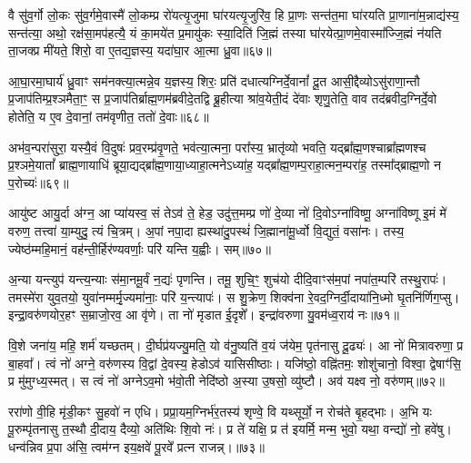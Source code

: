 वै सु॑व॒र्गो लो॒कः सु॑व॒र्गमे॒वास्मै॑ लो॒कम्प्र रो॑यत्यृ॒जुमा घा॑रयत्यृ॒जुरि॑व॒ हि प्रा॒णः सन्त॑त॒मा घा॑रयति प्रा॒णाना॑म॒न्नाद्य॑स्य॒ सन्त॑त्या॒ अथो॒ रक्ष॑सा॒मप॑हत्यै॒ यं का॒मये॑त प्र॒मायु॑कः स्या॒दिति॑ जि॒ह्मं तस्या घा॑रयेत्प्रा॒णमे॒वास्मा᳚ज्जि॒ह्मं न॑यति ता॒जक्प्र मी॑यते॒ शिरो॒ वा ए॒तद्य॒ज्ञस्य॒ यदा॑घा॒र आ॒त्मा ध्रु॒वा॥६७॥

आ॒घा॒रमा॒घार्य॑ ध्रु॒वाꣳ सम॑नक्त्या॒त्मन्ने॒व य॒ज्ञस्य॒ शिरः॒ प्रति॑ दधात्यग्निर्दे॒वानां᳚ दू॒त आसी॒द्दैव्यो\-ऽसु॑राणा॒न्तौ प्र॒जाप॑तिम्प्र॒श्ञमैता॒ꣳ॒ स प्र॒जाप॑तिर्ब्राह्म॒णम॑ब्रवीदे॒तद्वि ब्रू॒हीत्या श्रा॑व॒येती॒दं दे॑वाः शृणु॒तेति॒ वाव तद॑ब्रवीद॒ग्निर्दे॒वो होतेति॒ य ए॒व दे॒वानां॒ तम॑वृणीत॒ ततो॑ दे॒वाः॥६८॥

अभ॑व॒न्परा॑सुरा॒ यस्यै॒वं वि॒दुषः॑ प्रव॒रम्प्र॑वृ॒णते॒ भव॑त्या॒त्मना॒ परा᳚स्य॒ भ्रातृ॑व्यो भवति॒ यद्ब्रा᳚ह्म॒णश्चाब्रा᳚ह्मणश्च प्र॒श्ञमे॒यातां᳚ ब्राह्म॒णायाधि॑ ब्रूया॒द्यद्ब्रा᳚ह्म॒णाया॒ध्याहा॒त्मने\-ऽध्या॑ह॒ यद्ब्रा᳚ह्म॒णम्प॒राहा॒त्मन॒म्परा॑ह॒ तस्मा᳚द्ब्राह्म॒णो न प॒रोच्यः॑॥६९॥

{\anuvakamend[{वा आ॑र॒ण्याꣳश्चाव॑ रु॒न्धे\-ऽथो॑ प॒शुभिः॒ सो᳚\-ऽब्रवीद्दक्षिणा॒र्ध्य॑न्त्रय॑ इव ध्रु॒वा दे॒वाश्च॑त्वारि॒ꣳ॒शच्च॑॥11॥}]}

आयु॑ष्ट आयु॒र्दा अ॑ग्न॒ आ प्या॑यस्व॒ सं ते\-ऽव॑ ते॒ हेड॒ उदु॑त्त॒मम्प्र णो॑ दे॒व्या नो॑ दि॒वो\-ऽग्ना॑विष्णू॒ अग्ना॑विष्णू इ॒मं मे॑ वरुण॒ तत्त्वा॑ या॒म्युदु॒ त्यं चि॒त्रम्। अ॒पां नपा॒दा ह्यस्था॑दु॒पस्थं॑ जि॒ह्माना॑मू॒र्ध्वो वि॒द्युतं॒ वसा॑नः। तस्य॒ ज्येष्ठ॑म्महि॒मानं॒ वह॑न्ती॒र्\mbox{}हिर॑ण्यवर्णाः॒ परि॑ यन्ति य॒ह्वीः। सम्॥७०॥

अ॒न्या यन्त्युप॑ यन्त्य॒न्याः स॑मा॒नमू॒र्वं न॒द्यः॑ पृणन्ति। तमू॒ शुचि॒ꣳ॒ शुच॑यो दीदि॒वाꣳस॑म॒पां नपा॑त॒म्परि॑ तस्थु॒रापः॑। तमस्मे॑रा युव॒तयो॒ युवा॑नम्मर्मृ॒ज्यमा॑नाः॒ परि॑ य॒न्त्यापः॑। स शु॒क्रेण॒ शिक्व॑ना रे॒वद॒ग्निर्दी॒दाया॑नि॒ध्मो घृ॒तनि॑र्णिग॒प्सु। इन्द्रा॒वरु॑णयोर॒हꣳ स॒म्राजो॒रव॒ आ वृ॑णे। ता नो॑ मृडात ई॒दृशे᳚। इन्द्रा॑वरुणा यु॒वम॑ध्व॒राय॑ नः॥७१॥

वि॒शे जना॑य॒ महि॒ शर्म॑ यच्छतम्। दी॒र्घप्र॑यज्यु॒मति॒ यो व॑नु॒ष्यति॑ व॒यं ज॑येम॒ पृत॑नासु दू॒ढ्यः॑। आ नो॑ मित्रावरुणा॒ प्र बा॒हवा᳚। त्वं नो॑ अग्ने॒ वरु॑णस्य वि॒द्वां दे॒वस्य॒ हेडो\-ऽव॑ यासिसीष्ठाः। यजि॑ष्ठो॒ वह्नि॑तमः॒ शोशु॑चानो॒ विश्वा॒ द्वेषाꣳ॑सि॒ प्र मु॑मुग्ध्य॒स्मत्। स त्वं नो॑ अग्ने\-ऽव॒मो भ॑वो॒ती नेदि॑ष्ठो अ॒स्या उ॒षसो॒ व्यु॑ष्टौ। अव॑ यक्ष्व नो॒ वरु॑णम्॥७२॥

ररा॑णो वी॒हि मृ॑डी॒कꣳ सु॒हवो॑ न एधि। प्रप्रा॒यम॒ग्निर्भ॑र॒तस्य॑ शृण्वे॒ वि यथ्सूर्यो॒ न रोच॑ते बृ॒हद्भाः। अ॒भि यः पू॒रुम्पृ॑तनासु त॒स्थौ दी॒दाय॒ दैव्यो॒ अति॑थिः शि॒वो नः॑। प्र ते॑ यक्षि॒ प्र त॑ इयर्मि॒ मन्म॒ भुवो॒ यथा॒ वन्द्यो॑ नो॒ हवे॑षु। धन्व॑न्निव प्र॒पा अ॑सि॒ त्वम॑ग्न इय॒क्षवे॑ पू॒रवे᳚ प्रत्न राजन्न्।॥७३॥

